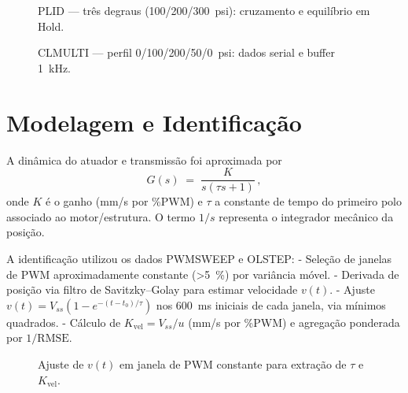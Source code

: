 \begin{figure}[h]
  \centering
  \caption{PLID — três degraus (100/200/300~psi): cruzamento e equilíbrio em Hold.}
  \label{fig:plid}
\end{figure}

\begin{figure}[h]
  \centering
  \caption{CLMULTI — perfil 0/100/200/50/0~psi: dados serial e buffer 1~kHz.}
  \label{fig:clmulti}
\end{figure}

\section{Modelagem e Identificação}
A dinâmica do atuador e transmissão foi aproximada por
\begin{equation}
  G(s) \;=\; \frac{K}{s(\tau s + 1)}\,,
\end{equation}
onde $K$ é o ganho (mm/s por \%PWM) e $\tau$ a constante de tempo do primeiro polo associado ao motor/estrutura. O termo $1/s$ representa o integrador mecânico da posição.

A identificação utilizou os dados PWMSWEEP e OLSTEP:
- Seleção de janelas de PWM aproximadamente constante (>5~\%) por variância móvel.
- Derivada de posição via filtro de Savitzky–Golay para estimar velocidade $v(t)$.
- Ajuste $v(t) = V_{ss}(1 - e^{-(t-t_0)/\tau})$ nos 600~ms iniciais de cada janela, via mínimos quadrados.
- Cálculo de $K_{\text{vel}} = V_{ss}/u$ (mm/s por \%PWM) e agregação ponderada por $1/\text{RMSE}$.

\begin{figure}[h]
  \centering
  \caption{Ajuste de $v(t)$ em janela de PWM constante para extração de $\tau$ e $K_{\text{vel}}$.}
  \label{fig:id}
\end{figure}

